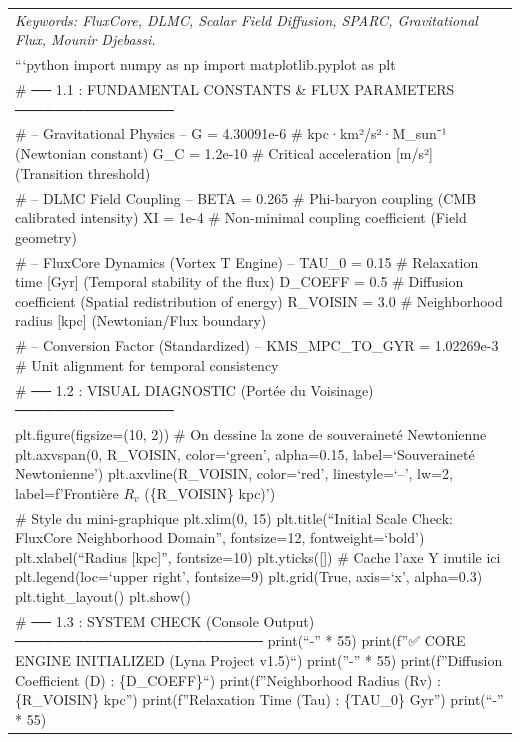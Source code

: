 \documentclass[
]{article}
\newcounter{none} %
\begin{document}
{\def\LTcaptype{none} %
\begin{longtable}[]{@{}
  >{\raggedright\arraybackslash}p{}@{}}
\toprule\noalign{}
\endhead
\bottomrule\noalign{}
\endlastfoot
\emph{Keywords: FluxCore, DLMC, Scalar Field Diffusion, SPARC,
Gravitational Flux, Mounir Djebassi.} \\
```python import numpy as np import matplotlib.pyplot as plt \\
\# ── 1.1 : FUNDAMENTAL CONSTANTS \& FLUX PARAMETERS ──────────────── \\
\# -- Gravitational Physics -- G = 4.30091e-6 \# kpc·km²/s²·M\_sun⁻¹
(Newtonian constant) G\_C = 1.2e-10 \# Critical acceleration {[}m/s²{]}
(Transition threshold) \\
\# -- DLMC Field Coupling -- BETA = 0.265 \# Phi-baryon coupling (CMB
calibrated intensity) XI = 1e-4 \# Non-minimal coupling coefficient
(Field geometry) \\
\# -- FluxCore Dynamics (Vortex T Engine) -- TAU\_0 = 0.15 \# Relaxation
time {[}Gyr{]} (Temporal stability of the flux) D\_COEFF = 0.5 \#
Diffusion coefficient (Spatial redistribution of energy) R\_VOISIN = 3.0
\# Neighborhood radius {[}kpc{]} (Newtonian/Flux boundary) \\
\# -- Conversion Factor (Standardized) -- KMS\_MPC\_TO\_GYR = 1.02269e-3
\# Unit alignment for temporal consistency \\
\# ── 1.2 : VISUAL DIAGNOSTIC (Portée du Voisinage) ──────────────── \\
plt.figure(figsize=(10, 2)) \# On dessine la zone de souveraineté
Newtonienne plt.axvspan(0, R\_VOISIN, color=`green', alpha=0.15,
label=`Souveraineté Newtonienne') plt.axvline(R\_VOISIN, color=`red',
linestyle=`--', lw=2, label=f'Frontière \(R_v\) (\{R\_VOISIN\} kpc)') \\
\# Style du mini-graphique plt.xlim(0, 15) plt.title(``Initial Scale
Check: FluxCore Neighborhood Domain'', fontsize=12, fontweight=`bold')
plt.xlabel(``Radius {[}kpc{]}'', fontsize=10) plt.yticks({[}{]}) \#
Cache l'axe Y inutile ici plt.legend(loc=`upper right', fontsize=9)
plt.grid(True, axis=`x', alpha=0.3) plt.tight\_layout() plt.show() \\
\# ── 1.3 : SYSTEM CHECK (Console Output) ─────────────────────────
print(``-'' * 55) print(f''✅ CORE ENGINE INITIALIZED (Lyna Project
v1.5)``) print(''-'' * 55) print(f''Diffusion Coefficient (D) :
\{D\_COEFF\}``) print(f''Neighborhood Radius (Rv) : \{R\_VOISIN\} kpc'')
print(f''Relaxation Time (Tau) : \{TAU\_0\} Gyr'') print(``-'' * 55)

\end{longtable}}
\end{document}
